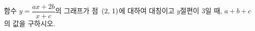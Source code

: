 \hspace*{2mm}\begin{minipage}[t]{\dimexpr\linewidth-2mm\relax}\vspace{0pt}
함수 $y=\dfrac{ax+2b}{x+c}$의 그래프가 점~$(2,\mkern3mu 1)$에 대하여 대칭이고 $y$절편이 $3$일 때, $a+b+c$의 값을 구하시오. \end{minipage}
